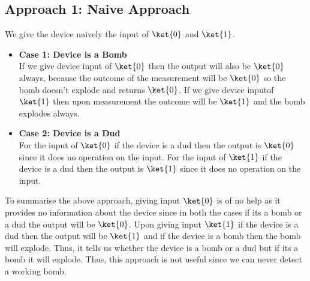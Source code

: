 \documentclass[12pt, oneside]{book}
\theoremstyle{definition}
\theoremstyle{definition}
\theoremstyle{remark}
\begin{document}
\subsection{Approach 1: Naive Approach }
We give the device naively the input of $\ket{0}$ and $\ket{1}$. 
    \begin{itemize} 
        \item \textbf{Case 1: Device is a Bomb}\\
        If we give device input of $\ket{0}$ then the output will also be $\ket{0}$ always, because the outcome of the measurement will be $\ket{0}$ so the bomb doesn't explode and returns $\ket{0}$. 
        If we give device inputof $\ket{1}$ then upon measurement the outcome will be $\ket{1}$ and the bomb explodes always.
        \item \textbf{Case 2: Device is a Dud}\\
        For the input of $\ket{0}$ if the device is a dud then the output is $\ket{0}$ since it does no operation on the input.
        For the input of $\ket{1}$ if the device is a dud then the output is $\ket{1}$ since it does no operation on the input.
    \end{itemize}
    To summarise the above approach, giving input $\ket{0}$ is of no help as it provides no information about the device since in both the cases if its a bomb or a dud the output will be $\ket{0}$. 
    Upon giving input $\ket{1}$ if the device is a dud then the output will be $\ket{1}$ and if the device is a bomb then the bomb will explode. Thus, it tells us whether the device is a bomb or a dud but if its a bomb it will explode. Thus, this approach is not useful since we can never detect a working bomb.
\end{document}

